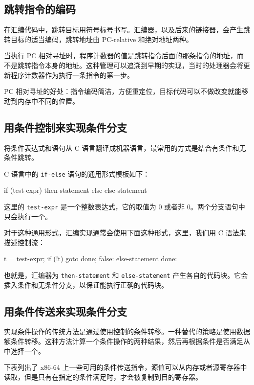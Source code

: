 \subsection{跳转指令的编码}

在汇编代码中，跳转目标用符号标号书写。汇编器，以及后来的链接器，会产生跳转目标的适当编码，跳转地址由 PC-relative 和绝对地址两种。

当执行 PC 相对寻址时，程序计数器的值是跳转指令后面的那条指令的地址，而不是跳转指令本身的地址。这种管理可以追溯到早期的实现，当时的处理器会将更新程序计数器作为执行一条指令的第一步。

PC 相对寻址的好处：指令编码简洁，方便重定位，目标代码可以不做改变就能移动到内存中不同的位置。

\subsection{用条件控制来实现条件分支}

将条件表达式和语句从 C 语言翻译成机器语言，最常用的方式是结合有条件和无条件跳转。

C 语言中的 \verb|if-else| 语句的通用形式模板如下：

\begin{cppcode}
if (test-expr)
  then-statement
else
  else-statement
\end{cppcode}

这里的 \verb|test-expr| 是一个整数表达式，它的取值为 0 或者非 0。两个分支语句中只会执行一个。

对于这种通用形式，汇编实现通常会使用下面这种形式，这里，我们用 C 语法来描述控制流：

\begin{cppcode}
  t = test-expr;
  if (!t)
    goto done;
false:
  else-statement
done:
\end{cppcode}

也就是，汇编器为 \verb|then-statement| 和 \verb|else-statement| 产生各自的代码块。它会插入条件和无条件分支，以保证能执行正确的代码块。

\subsection{用条件传送来实现条件分支}

实现条件操作的传统方法是通过使用控制的条件转移。一种替代的策略是使用数据额条件转移。这种方法计算一个条件操作的两种结果，然后再根据条件是否满足从中选择一个。

下表列出了 x86-64 上一些可用的条件传送指令，源值可以从内存或者源寄存器中读取，但是只有在指定的条件满足时，才会被复制到目的寄存器。


